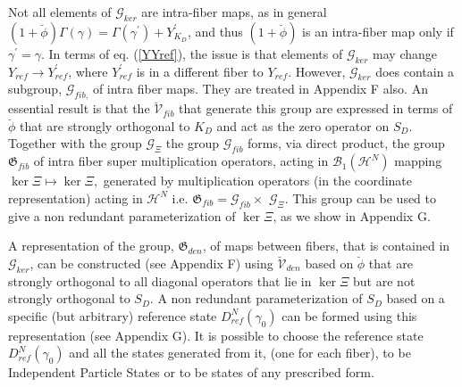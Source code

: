 \documentclass[aps,preprint]{revtex4}%
\begin{document}
Not all elements of $\mathcal{G}_{ker}$ are intra-fiber maps, as in general
$\left(  1+\breve{\phi}\right)  \Gamma\left(  \gamma\right)  =\Gamma\left(
\gamma^{\prime}\right)  +Y_{K_{D}}^{\prime}$, and thus $\left(  1+\breve{\phi
}\right)  $ is an intra-fiber map only if $\gamma^{\prime}=\gamma$. In terms
of eq. (\ref{YYref}), the issue is that elements of $\mathcal{G}_{ker}$ may
change $Y_{ref}\rightarrow Y_{ref}^{\prime}$, where $Y_{ref}^{\prime}$ is in a
different fiber to $Y_{ref}$. However, $\mathcal{G}_{ker}$ does contain a
subgroup, $\mathcal{G}_{fib\text{,}}$ of intra fiber maps. They are treated in
Appendix F also. An essential result is that the $\mathcal{\breve{V}}_{fib}$
that generate this group are expressed in terms of $\breve{\phi}$ that are
strongly orthogonal to $K_{D}$ and act as the zero operator on $S_{D}$.
Together with the group $\mathcal{G}_{\Xi}$ the group $\mathcal{G}_{fib}$
forms, via direct product, the group $\mathfrak{G}_{fib}$ of intra fiber super
multiplication operators, acting in $\mathcal{B}_{1}\left(  \mathcal{H}%
^{N}\right)  $ mapping $\ker\Xi\mapsto\ker\Xi,$ generated by multiplication
operators (in the coordinate representation) acting in $\mathcal{H}^{N}$ i.e.
$\mathfrak{G}_{fib}=\mathcal{G}_{fib}\times$ $\mathcal{G}_{\Xi}$. This group
can be used to give a non redundant parameterization of $\ker\Xi$, as we show
in Appendix G.

A representation of the group, $\mathfrak{G}_{den}$, of maps between fibers,
that is contained in $\mathcal{G}_{ker}$, can be constructed (see Appendix F)
using $\mathcal{\breve{V}}_{den}$ based on $\breve{\phi}$ that are strongly
orthogonal to all diagonal operators that lie in $\ker\Xi$ but are not
strongly orthogonal to $S_{D}$. A non redundant parameterization of $S_{D}$
based on a specific (but arbitrary) reference state $D_{ref}^{N}\left(
\gamma_{0}\right)  $ can be formed using this representation (see Appendix G).
It is possible to choose the reference state $D_{ref}^{N}\left(  \gamma
_{0}\right)  $ and all the states generated from it, (one for each fiber), to
be Independent Particle States or to be states of any prescribed form.
\end{document}
